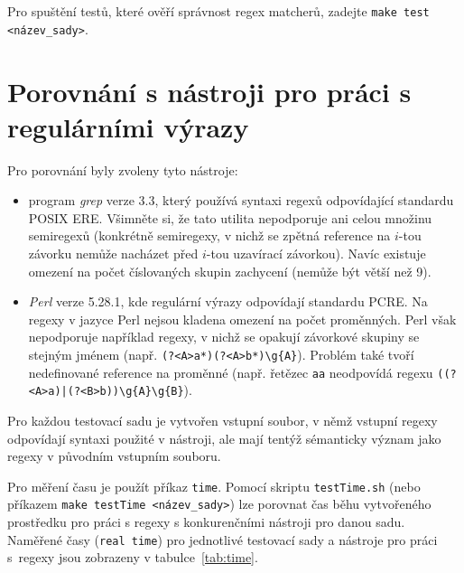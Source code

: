 \documentclass[thesis=B,czech]{FITthesis}[2019/12/23]
\theoremstyle{definition}
\begin{document}
Pro spuštění testů, které ověří správnost regex matcherů, zadejte \texttt{make test <název\_sady>}.  

\section{Porovnání s nástroji pro práci s regulárními výrazy}
 Pro porovnání byly zvoleny tyto nástroje:
 \begin{itemize}
	\item{program \emph{grep} verze 3.3, který používá syntaxi regexů odpovídající standardu POSIX ERE. Všimněte si, že tato utilita nepodporuje ani celou množinu semiregexů (konkrétně semiregexy, v nichž se zpětná reference na $i$-tou závorku nemůže nacházet před $i$-tou uzavírací závorkou). Navíc existuje omezení na počet číslovaných skupin zachycení (nemůže být větší než 9).}
	\item{\emph{Perl} verze 5.28.1, kde regulární výrazy odpovídají standardu PCRE. Na regexy v jazyce Perl nejsou kladena omezení na počet proměnných. Perl však nepodporuje například regexy, v nichž se opakují závorkové skupiny se stejným jménem (např. \texttt{(?<A>a*)(?<A>b*)\textbackslash g\{A\}}). Problém také tvoří nedefinované reference na proměnné (např. řetězec \texttt{aa} neodpovídá regexu \texttt{((?<A>a)|(?<B>b))\textbackslash g\{A\}\textbackslash g\{B\}}). }
 \end{itemize}

Pro každou testovací sadu je vytvořen vstupní soubor, v němž vstupní regexy odpovídají syntaxi použité v nástroji, ale mají tentýž sémanticky význam jako regexy v původním vstupním souboru.   

Pro měření času je použít příkaz \texttt{time}. Pomocí skriptu \texttt{testTime.sh} (nebo příkazem \texttt{make testTime <název\_sady>}) lze porovnat čas běhu vytvořeného prostředku pro práci s regexy s konkurenčními nástroji pro danou sadu. 
Naměřené časy (\texttt{real time}) pro jednotlivé testovací sady a nástroje pro práci s~regexy jsou zobrazeny v tabulce~\ref{tab:time}. 
\end{document}
